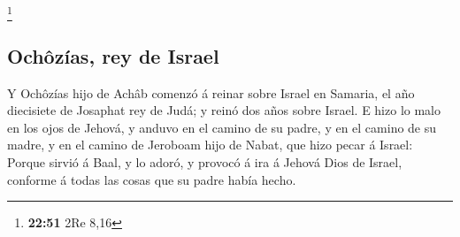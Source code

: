 \footnote{\textbf{22:51} 2Re 8,16}

\hypertarget{ochuxf4zuxedas-rey-de-israel}{%
\subsection{Ochôzías, rey de
Israel}\label{ochuxf4zuxedas-rey-de-israel}}

 Y Ochôzías hijo de Achâb comenzó á reinar sobre Israel
en Samaria, el año diecisiete de Josaphat rey de Judá; y reinó dos años
sobre Israel.  E hizo lo malo en los ojos de Jehová, y
anduvo en el camino de su padre, y en el camino de su madre, y en el
camino de Jeroboam hijo de Nabat, que hizo pecar á Israel: Porque sirvió
á Baal, y lo adoró, y provocó á ira á Jehová Dios de Israel, conforme á
todas las cosas que su padre había hecho.
